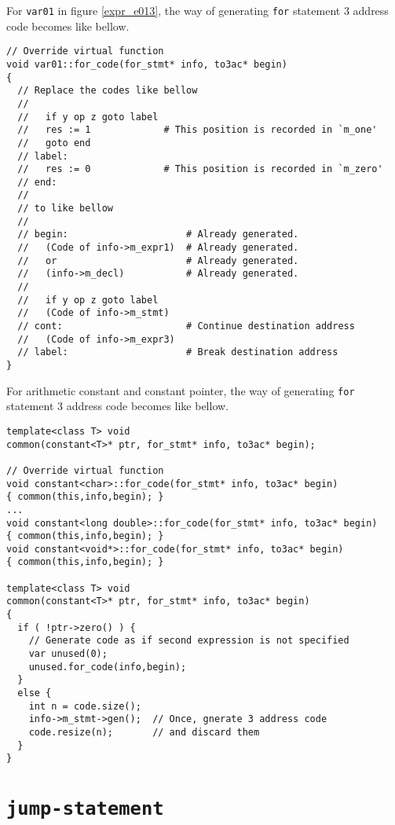 For {\tt{var01}} in figure \ref{expr_e013},
the way of generating {\tt{for}} statement 3 address code
becomes like bellow.
\begin{verbatim}
// Override virtual function
void var01::for_code(for_stmt* info, to3ac* begin)
{
  // Replace the codes like bellow
  //
  //   if y op z goto label
  //   res := 1             # This position is recorded in `m_one'
  //   goto end
  // label:
  //   res := 0             # This position is recorded in `m_zero'
  // end:
  //
  // to like bellow
  //
  // begin:                     # Already generated.
  //   (Code of info->m_expr1)  # Already generated.
  //   or                       # Already generated.
  //   (info->m_decl)           # Already generated.
  //
  //   if y op z goto label
  //   (Code of info->m_stmt)
  // cont:                      # Continue destination address
  //   (Code of info->m_expr3)
  // label:                     # Break destination address
}
\end{verbatim}
For arithmetic constant and constant pointer,
the way of generating {\tt{for}} statement 3 address code
becomes like bellow.
\begin{verbatim}
template<class T> void
common(constant<T>* ptr, for_stmt* info, to3ac* begin);

// Override virtual function
void constant<char>::for_code(for_stmt* info, to3ac* begin)
{ common(this,info,begin); }
...
void constant<long double>::for_code(for_stmt* info, to3ac* begin)
{ common(this,info,begin); }
void constant<void*>::for_code(for_stmt* info, to3ac* begin)
{ common(this,info,begin); }

template<class T> void
common(constant<T>* ptr, for_stmt* info, to3ac* begin)
{
  if ( !ptr->zero() ) {
    // Generate code as if second expression is not specified
    var unused(0);
    unused.for_code(info,begin);
  }
  else {
    int n = code.size();
    info->m_stmt->gen();  // Once, gnerate 3 address code
    code.resize(n);       // and discard them
  }
}
\end{verbatim}

\section{\tt{jump-statement}}

